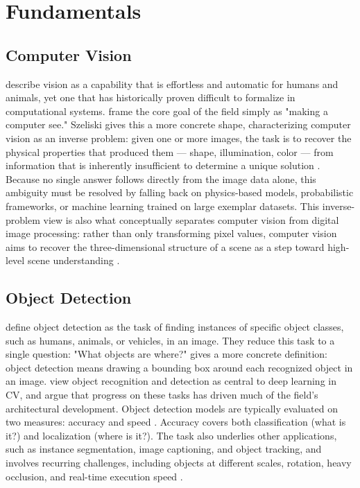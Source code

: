 \chapter{Fundamentals}
\label{ch:fundamentals}

\section{Computer Vision}
\label{sec:computer-vision}

\textcite{Goodfellow-et-al-2016} describe vision as a capability that is effortless and automatic for humans and animals, yet one that has historically proven difficult to formalize in computational systems. \textcite{hartley_multiple_2003} frame the core goal of the field simply as "making a computer see." Szeliski gives this a more concrete shape, characterizing computer vision as an inverse problem: given one or more images, the task is to recover the physical properties that produced them — shape, illumination, color — from information that is inherently insufficient to determine a unique solution \parencite{szeliski_computer_2022}. Because no single answer follows directly from the image data alone, this ambiguity must be resolved by falling back on physics-based models, probabilistic frameworks, or machine learning trained on large exemplar datasets. This inverse-problem view is also what conceptually separates computer vision from digital image processing: rather than only transforming pixel values, computer vision aims to recover the three-dimensional structure of a scene as a step toward high-level scene understanding \parencite{szeliski_computer_2022}.

\section{Object Detection}
\label{object-detection}

\textcite{zou_obj_2023} define object detection as the task of finding instances of specific object classes, such as humans, animals, or vehicles, in an image. They reduce this task to a single question: "What objects are where?" 
\textcite{szeliski_computer_2022} gives a more concrete definition: object detection means drawing a bounding box around each recognized object in an image. \textcite{Goodfellow-et-al-2016} view object recognition and detection as central to deep learning in CV, and argue that progress on these tasks has driven much of the field's architectural development. Object detection models are typically evaluated on two measures: accuracy and speed \parencite{zou_obj_2023}. Accuracy covers both classification (what is it?) and localization (where is it?). The task also underlies other applications, such as instance segmentation, image captioning, and object tracking, and involves recurring challenges, including objects at different scales, rotation, heavy occlusion, and real-time execution speed \parencite{zou_obj_2023}.

